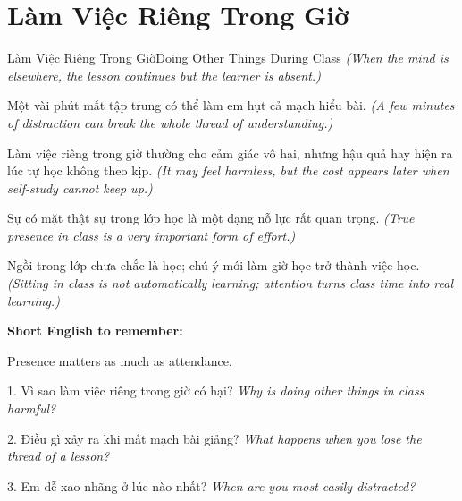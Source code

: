 \section{Làm Việc Riêng Trong Giờ}
\begin{truyen}{Làm Việc Riêng Trong Giờ}{Doing Other Things During Class}
\textit{(When the mind is elsewhere, the lesson continues but the learner is absent.)}

Một vài phút mất tập trung có thể làm em hụt cả mạch hiểu bài.
\textit{(A few minutes of distraction can break the whole thread of understanding.)}

Làm việc riêng trong giờ thường cho cảm giác vô hại, nhưng hậu quả hay hiện ra lúc tự học không theo kịp.
\textit{(It may feel harmless, but the cost appears later when self-study cannot keep up.)}

Sự có mặt thật sự trong lớp học là một dạng nỗ lực rất quan trọng.
\textit{(True presence in class is a very important form of effort.)}
\end{truyen}

\begin{baihoc}
Ngồi trong lớp chưa chắc là học; chú ý mới làm giờ học trở thành việc học.
\textit{(Sitting in class is not automatically learning; attention turns class time into real learning.)}
\end{baihoc}

\begin{ghinhoanh}
\textbf{Short English to remember:}

Presence matters as much as attendance.

\end{ghinhoanh}

\begin{tuhocnhanh}
1. Vì sao làm việc riêng trong giờ có hại? \textit{Why is doing other things in class harmful?}

2. Điều gì xảy ra khi mất mạch bài giảng? \textit{What happens when you lose the thread of a lesson?}

3. Em dễ xao nhãng ở lúc nào nhất? \textit{When are you most easily distracted?}
\end{tuhocnhanh}
\ngancach

